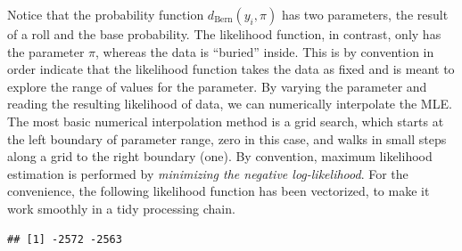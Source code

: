 \documentclass[]{svmono}
\newenvironment{Shaded}{\begin{snugshade}}{\end{snugshade}}
\newcommand{\KeywordTok}[1]{\textcolor[rgb]{0.13,0.29,0.53}{\textbf{#1}}}
\newcommand{\DecValTok}[1]{\textcolor[rgb]{0.00,0.00,0.81}{#1}}
\newcommand{\StringTok}[1]{\textcolor[rgb]{0.31,0.60,0.02}{#1}}
\newcommand{\ControlFlowTok}[1]{\textcolor[rgb]{0.13,0.29,0.53}{\textbf{#1}}}
\newcommand{\OperatorTok}[1]{\textcolor[rgb]{0.81,0.36,0.00}{\textbf{#1}}}
\newcommand{\NormalTok}[1]{#1}
\begin{document}
Notice that the probability function \(d_\text{Bern}(y_i, \pi)\) has two
parameters, the result of a roll and the base probability. The
likelihood function, in contrast, only has the parameter \(\pi\),
whereas the data is ``buried'' inside. This is by convention in order
indicate that the likelihood function takes the data as fixed and is
meant to explore the range of values for the parameter. By varying the
parameter and reading the resulting likelihood of data, we can
numerically interpolate the MLE. The most basic numerical interpolation
method is a grid search, which starts at the left boundary of parameter
range, zero in this case, and walks in small steps along a grid to the
right boundary (one). By convention, maximum likelihood estimation is
performed by \emph{minimizing the negative log-likelihood}. For the
convenience, the following likelihood function has been vectorized, to
make it work smoothly in a tidy processing chain.

\begin{Shaded}
\end{Shaded}

\begin{verbatim}
## [1] -2572 -2563
\end{verbatim}
\end{document}
